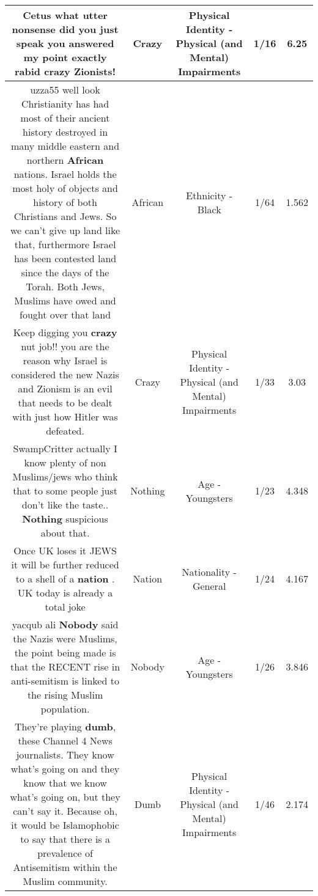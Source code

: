 \documentclass[11pt]{article}
\newlength\mylength
\begin{document}
\begin{center}
\begin{longtable}{|C{.65\mylength}|C{.30\mylength}|C{.12\mylength}|C{.12\mylength}|C{.12\mylength}|}
  \small Cetus what utter nonsense did you just speak you answered my point exactly rabid \textbf{crazy} Zionists!\normalsize   & Crazy & Physical Identity - Physical (and Mental) Impairments & 1/16 & 6.25 \\  \hline
  \small uzza55 well look Christianity has had most of their ancient history destroyed in many middle eastern and northern \textbf{African} nations. Israel holds the most holy of objects and history of both Christians and Jews. So we can't give up land like that, furthermore Israel has been contested land since the days of the Torah. Both Jews, Muslims have owed and fought over that land\normalsize   & African & Ethnicity - Black & 1/64 & 1.562 \\  \hline
  \small Keep digging you \textbf{crazy} nut job!! you are the reason why Israel is considered the new Nazis and Zionism is an evil that needs to be dealt with just how Hitler was defeated.\normalsize   & Crazy & Physical Identity - Physical (and Mental) Impairments & 1/33 & 3.03 \\  \hline
  \small SwampCritter actually I know plenty of non Muslims/jews who think that to some people just don't like the taste.. \textbf{Nothing} suspicious about that.\normalsize   & Nothing & Age - Youngsters & 1/23 & 4.348 \\  \hline
  \small Once UK loses it JEWS it will be further reduced to a shell of a \textbf{nation} . UK today is already a total joke\normalsize   & Nation & Nationality - General & 1/24 & 4.167 \\  \hline
  \small yacqub ali \textbf{Nobody} said the Nazis were Muslims, the point being made is that the RECENT rise in anti-semitism is linked to the rising Muslim population.\normalsize   & Nobody & Age - Youngsters & 1/26 & 3.846 \\  \hline
  \small They're playing \textbf{dumb}, these Channel 4 News journalists. They know what's going on and they know that we know what's going on, but they can't say it. Because oh, it would be Islamophobic to say that there is a prevalence of Antisemitism within the Muslim community.\normalsize   & Dumb & Physical Identity - Physical (and Mental) Impairments & 1/46 & 2.174 \\  \hline

\end{longtable}
\end{center}
\end{document}
